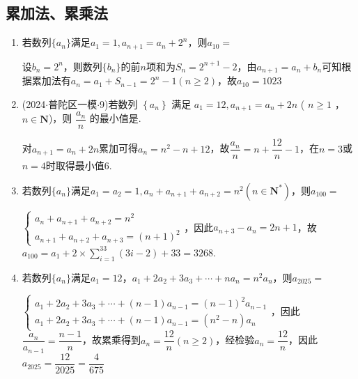 \subsection*{累加法、累乘法}
\begin{enumerate}
    \item 若数列$\{a_n\}$满足$a_1 = 1, a_{n+1} = a_n + 2^n$，则$a_{10} = $
    \begin{jieda}
        设$b_n = 2^n$，则数列$\{b_n\}$的前$n$项和为$S_n = 2^{n+1} - 2$，由$a_{n+1} = a_n + b_n$可知根据累加法有$a_n = a_1 + S_{n-1} = 2^n - 1(n \geq 2)$，故$a_{10} = 1023$
    \end{jieda}
    \item (2024$\cdot$普陀区一模$\cdot$9)若数列 $\left\{  {a}_{n}\right\}$ 满足 ${a}_{1} = {12},{a}_{n + 1} = {a}_{n} + {2n}$ ( $n \geq  1$ ， $n \in  \mathbf{N}$)，则 $\dfrac{{a}_{n}}{n}$ 的最小值是.
    \begin{jieda}
        对${a}_{n + 1} = {a}_{n} + {2n}$累加可得$a_n = n^2 - n + 12$，故$\dfrac{a_n}{n} = n + \dfrac{12}{n} - 1$，在$n = 3$或$n = 4$时取得最小值$6$.
    \end{jieda}
    \item 若数列$\{a_n\}$满足$a_1 = a_2 = 1, a_n + a_{n+1} + a_{n+2}= n^2 (n \in \mathbf{N^*})$，则$a_{100} = $
    \begin{jieda}
        $\left \{ \begin{array}{l}
            a_n + a_{n+1} + a_{n+2}= n^2  \\
            a_{n+1} + a_{n+2} + a_{n+3}= (n+1)^2 
        \end{array}\right.$，因此$a_{n+3} - a_n = 2n+1$，故$a_{100} = a_1 + 2 \times \sum_{i = 1}^{33}(3i-2) + 33 = 3268$.
    \end{jieda}
    \item 若数列$\{a_n\}$满足$a_1 = 12$，$a_1 + 2a_2 + 3a_3 + \cdots + na_n = n^2a_n$，则$a_{2025} = $
    \begin{jieda}
        $\left \{ \begin{array}{l}
                a_1 + 2a_2 + 3a_3 + \cdots + (n-1)a_{n-1} = (n-1)^2a_{n-1}  \\
                a_1 + 2a_2 + 3a_3 + \cdots + (n-1)a_{n-1} = (n^2-n)a_n
        \end{array} \right.$，因此$\dfrac{a_n}{a_{n-1}} = \dfrac{n-1}{n}$，故累乘得到$a_n = \dfrac{12}{n} (n \geq 2)$，经检验$a_n = \dfrac{12}{n}$，因此$a_{2025} = \dfrac{12}{2025} = \dfrac{4}{675}$
    \end{jieda}
\end{enumerate}
